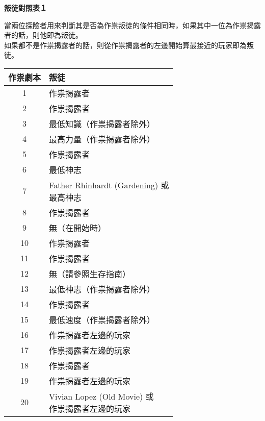 \vfill\null\pagebreak

\begin{center}
  \Huge\bfseries 叛徒對照表１
\end{center}
當兩位探險者用來判斷其是否為作祟叛徒的條件相同時，如果其中一位為作祟揭露者的話，則他即為叛徒。 \\
如果都不是作祟揭露者的話，則從作祟揭露者的左邊開始算最接近的玩家即為叛徒。

\begin{center}
  \begin{minipage}[t]{.45\textwidth}
    \renewcommand{\arraystretch}{1.5}
    \begin{tabular}[t]{ c l }
      \toprule
        \bfseries 作祟劇本 & \bfseries 叛徒 \\[.5ex]
      \midrule
        1  & 作祟揭露者 \\
        2  & 作祟揭露者 \\
        3  & 最低知識（作祟揭露者除外） \\
        4  & 最高力量（作祟揭露者除外） \\
        5  & 作祟揭露者 \\

        6  & 最低神志 \\
        7  & \makecell[tl]{Father Rhinhardt (Gardening) 或 \\ 最高神志} \\
        8  & 作祟揭露者 \\
        9  & 無（在開始時） \\
        10 & 作祟揭露者 \\

        11 & 作祟揭露者 \\
        12 & 無（請參照生存指南）\\
        13 & 最低神志（作祟揭露者除外） \\
        14 & 作祟揭露者 \\
        15 & 最低速度（作祟揭露者除外） \\

        16 & 作祟揭露者左邊的玩家 \\
        17 & 作祟揭露者左邊的玩家 \\
        18 & 作祟揭露者 \\
        19 & 作祟揭露者左邊的玩家 \\
        20 & \makecell[tl]{Vivian Lopez (Old Movie) 或 \\ 作祟揭露者左邊的玩家} \\


\end{tabular}
\end{minipage}
\end{center}
